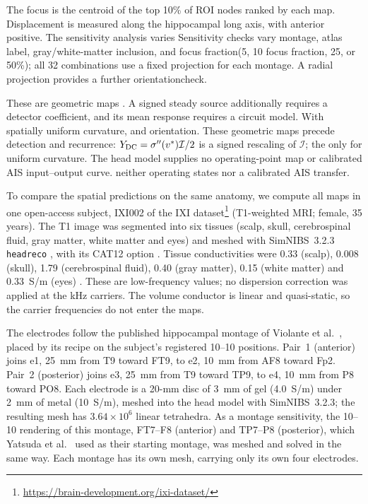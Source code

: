 \documentclass[11pt,a4paper]{article}
\newcommand{\Sig}{\sigma}
\providecommand{\DIFaddtex}[1]{{\protect\color{blue} \sf #1}} %
\providecommand{\DIFdeltex}[1]{{\protect\color{red} \scriptsize #1}} %
\providecommand{\DIFaddbegin}{} %
\providecommand{\DIFaddend}{} %
\providecommand{\DIFdelbegin}{} %
\providecommand{\DIFdelend}{} %
\providecommand{\DIFadd}[1]{\texorpdfstring{\DIFaddtex{#1}}{#1}} %
\providecommand{\DIFdel}[1]{\texorpdfstring{\DIFdeltex{#1}}{}} %
\begin{document}
The focus is the centroid of the top 10\% of ROI nodes ranked by each map.
Displacement is measured along the hippocampal long axis, with anterior positive.
\DIFdelbegin \DIFdel{The sensitivity analysis varies }\DIFdelend \DIFaddbegin \DIFadd{Sensitivity checks vary }\DIFaddend montage, atlas label, gray/white-matter inclusion,
\DIFdelbegin \DIFdel{and focus fraction(5, 10}\DIFdelend \DIFaddbegin \DIFadd{focus fraction}\DIFaddend , \DIFdelbegin \DIFdel{25, or 50\%); all 32 combinations use a fixed projection
for each montage. A radial projection provides a further orientationcheck. }%

\DIFdel{These are geometric maps . A signed steady source additionally requires a detector
coefficient, and
its mean response requires a circuit model. With spatially
uniform curvature, }\DIFdelend \DIFaddbegin \DIFadd{and orientation. These geometric maps precede detection and
recurrence: }\DIFaddend $Y_{\rm DC}=\Sig''(v^*)\mathcal I/2$ is a signed rescaling \DIFdelbegin \DIFdel{of
$\mathcal I$; the }\DIFdelend \DIFaddbegin \DIFadd{only
for uniform curvature. The }\DIFaddend head model supplies \DIFdelbegin \DIFdel{no operating-point map or calibrated AIS input--output curve.
}\DIFdelend \DIFaddbegin \DIFadd{neither operating states nor
a calibrated AIS transfer.
}

\DIFaddend \else
\label{supp:fem-protocol}
To compare the spatial predictions on the same anatomy, we compute all maps
in one open-access subject,
IXI002 of the IXI dataset\footnote{\url{https://brain-development.org/ixi-dataset/}}
(T1-weighted MRI; female, 35 years). The T1 image was segmented into six tissues
(scalp, skull, cerebrospinal fluid, gray matter, white matter and eyes) and meshed with
SimNIBS~3.2.3 \texttt{headreco} \cite{nielsen2018}, with its CAT12 option
\cite{gaser2024}. Tissue conductivities were 0.33 (scalp), 0.008 (skull), 1.79
(cerebrospinal fluid), 0.40 (gray matter), 0.15 (white matter) and 0.33~S/m (eyes)
\cite{salvador2025}. These are low-frequency values; no dispersion correction was
applied at the kHz carriers. The volume conductor is linear and quasi-static, so the
carrier frequencies do not enter the maps.

The electrodes follow the published hippocampal montage of Violante et al.\
\cite{violante2023}, placed by its recipe on the subject's registered 10--10
positions. Pair~1 (anterior) joins e1, 25~mm from T9 toward FT9, to e2, 10~mm from AF8
toward Fp2. Pair~2 (posterior) joins e3, 25~mm from T9 toward TP9, to e4, 10~mm from P8
toward PO8. Each electrode is a 20-mm disc of 3~mm of gel (4.0~S/m) under 2~mm of metal
(10~S/m), meshed into the head model with SimNIBS~3.2.3; the resulting mesh has
$3.64\times10^6$ linear tetrahedra. As a montage sensitivity, the 10--10 rendering of
this montage, FT7--F8 (anterior) and TP7--P8 (posterior), which Yatsuda et al.\
\cite{yatsuda2024} used as their starting montage, was meshed and solved in the same
way. Each montage has its own mesh, carrying only its own four electrodes.
\end{document}
